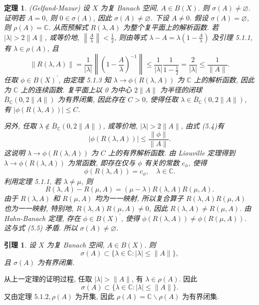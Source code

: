 \documentclass[openany]{ctexbook}
\makeatletter
\theoremstyle{kaiti}
\newtheorem{theorem}{定理}[section]
\newtheorem{lemma}{引理}[section]
\theoremstyle{normal}
\renewenvironment{proof}[1][\proofname]{\par
    \pushQED{\qed}%
    \normalfont \topsep6\p@\@plus6\p@\relax
    \trivlist
    \item\relax
    {\heiti #1}\hspace{2\labelsep}\ignorespaces
  }{%
    \popQED\endtrivlist\@endpefalse
  }
\makeatother
\begin{document}
\begin{theorem}
(Gelfand-Mazur) 设 $X$ 为复 Banach 空间, $A \in B(X)$. 则 $\sigma(A) \neq \varnothing$. 证明若 $A=0$, 则 $0 \in \sigma(A)$, 因此 $\sigma(A) \neq \varnothing$. 下设 $A \neq 0$. 假设 $\sigma(A)=\varnothing$, 则 $\rho(A)=\mathbb{C}$. 从而预解式 $R(\lambda, A)$ 为整个复平面上的解析函数. 若 $|\lambda|>2\|A\|$, 或等价地, $\left\|\frac{A}{\lambda}\right\|<\frac{1}{2}$, 则由等式 $\lambda-A=\lambda\left(1-\frac{A}{\lambda}\right)$ 及引理 5.1.1, 有 $\lambda \in \rho(A)$, 且
\begin{equation}
  \|R(\lambda, A)\|=\frac{1}{|\lambda|}\left\|\left(1-\frac{A}{\lambda}\right)^{-1}\right\| \leqslant \frac{1}{|\lambda|} \frac{1}{1-\frac{1}{2}}=\frac{2}{|\lambda|} \leqslant \frac{1}{\|A\|}.
\end{equation}
任取 $\phi \in B(X)^{\prime}$, 由定理 5.1.3 知 $\lambda \rightarrow \phi(R(\lambda, A))$ 为 $\mathbb{C}$ 上的解析函数, 因此为 $\mathbb{C}$ 上的连续函数. 复平面上以 0 为中心 $2\|A\|$ 为半径的闭球 $\bar{B}_{\mathbb{C}}(0,2\|A\|)$ 为有界闭集, 因此存在 $C>0$, 使得任取 $\lambda \in \bar{B}_{\mathbb{C}}(0,2\|A\|)$, 有 $|\phi(R(\lambda, A))| \leqslant C$.

另外, 任取 $\lambda \notin \bar{B}_{\mathbb{C}}(0,2\|A\|)$, 或等价地, $|\lambda|>2\|A\|$, 由式 (5.4)有
$$
|\phi(R(\lambda, A))| \leqslant \frac{\|\phi\|}{\|A\|}.
$$
这说明 $\lambda \rightarrow \phi(R(\lambda, A))$ 为 $C$ 上的有界解析函数. 由 Liouville 定理得到 $\lambda \rightarrow \phi(R(\lambda, A))$ 为常函数, 即存在仅与 $\phi$ 有关的常数 $c_{\phi}$, 使得
\begin{equation}
  \phi(R(\lambda, A))=c_{\phi}, \quad \lambda \in \mathbb{C}.
\end{equation}
利用定理 5.1.1, 若 $\lambda \neq \mu$, 则
$$
R(\lambda, A)-R(\mu, A)=(\mu-\lambda) R(\lambda, A) R(\mu, A).
$$
由于 $R(\lambda, A)$ 和 $R(\mu, A)$ 均为一一映射, 所以复合算子 $R(\lambda, A) R(\mu, A)$ 也为一一映射, 特别地, $R(\lambda, A) R(\mu, A) \neq 0$, 因此 $R(\lambda, A) \neq R(\mu, A)$. 由 Hahn-Banach 定理, 存在 $\phi \in B(X)^{\prime}$, 使得 $\phi(R(\lambda, A)) \neq \phi(R(\mu, A))$. 这与式 (5.5) 矛盾. 所以 $\sigma(A) \neq \varnothing$.
\end{theorem}

\begin{lemma}
设 $X$ 为复 Banach 空间, $A \in B(X)$. 则
$$
\sigma(A) \subset\{\lambda \in \mathbb{C}:|\lambda| \leqslant\|A\|\},
$$
且 $\sigma(A)$ 为有界闭集.
\end{lemma}

\begin{proof}
从上一定理的证明过程, 任取 $|\lambda|>\|A\|$, 有 $\lambda \in \rho(A)$. 因此
$$
\sigma(A) \subset\{\lambda \in \mathbb{C}:|\lambda| \leqslant\|A\|\}.
$$
又由定理 $5.1.2, \rho(A)$ 为开集, 因此 $\rho(A)=\mathbb{C} \backslash \rho(A)$ 为有界闭集.
\end{proof}
\end{document}
